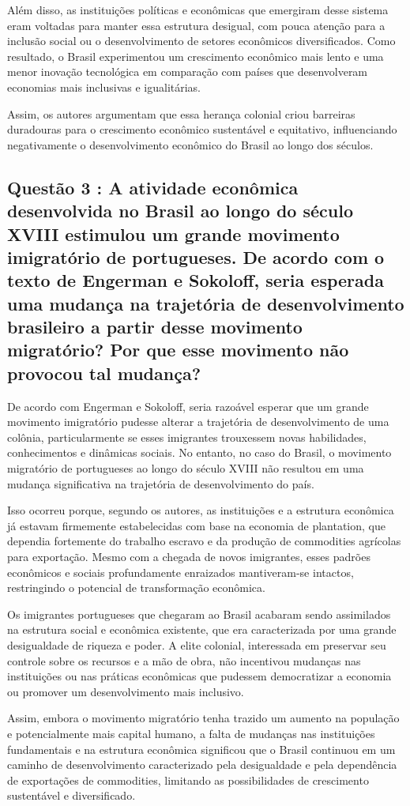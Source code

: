 \documentclass[a4paper,12pt]{article}[abntex2]
\begin{document}
Além disso, as instituições políticas e econômicas que emergiram desse sistema eram voltadas para manter essa estrutura desigual, com pouca atenção para a inclusão social ou o desenvolvimento de setores econômicos diversificados. Como resultado, o Brasil experimentou um crescimento econômico mais lento e uma menor inovação tecnológica em comparação com países que desenvolveram economias mais inclusivas e igualitárias.

Assim, os autores argumentam que essa herança colonial criou barreiras duradouras para o crescimento econômico sustentável e equitativo, influenciando negativamente o desenvolvimento econômico do Brasil ao longo dos séculos.

\subsection{\textbf{Questão 3 : A atividade econômica desenvolvida no Brasil ao longo do século XVIII estimulou um grande movimento imigratório de portugueses. De acordo com o texto de Engerman e Sokoloff, seria esperada uma mudança na trajetória de desenvolvimento brasileiro a partir desse movimento migratório? Por que esse movimento não provocou tal mudança? 
}}

De acordo com Engerman e Sokoloff, seria razoável esperar que um grande movimento imigratório pudesse alterar a trajetória de desenvolvimento de uma colônia, particularmente se esses imigrantes trouxessem novas habilidades, conhecimentos e dinâmicas sociais. No entanto, no caso do Brasil, o movimento migratório de portugueses ao longo do século XVIII não resultou em uma mudança significativa na trajetória de desenvolvimento do país.

Isso ocorreu porque, segundo os autores, as instituições e a estrutura econômica já estavam firmemente estabelecidas com base na economia de plantation, que dependia fortemente do trabalho escravo e da produção de commodities agrícolas para exportação. Mesmo com a chegada de novos imigrantes, esses padrões econômicos e sociais profundamente enraizados mantiveram-se intactos, restringindo o potencial de transformação econômica.

Os imigrantes portugueses que chegaram ao Brasil acabaram sendo assimilados na estrutura social e econômica existente, que era caracterizada por uma grande desigualdade de riqueza e poder. A elite colonial, interessada em preservar seu controle sobre os recursos e a mão de obra, não incentivou mudanças nas instituições ou nas práticas econômicas que pudessem democratizar a economia ou promover um desenvolvimento mais inclusivo.

Assim, embora o movimento migratório tenha trazido um aumento na população e potencialmente mais capital humano, a falta de mudanças nas instituições fundamentais e na estrutura econômica significou que o Brasil continuou em um caminho de desenvolvimento caracterizado pela desigualdade e pela dependência de exportações de commodities, limitando as possibilidades de crescimento sustentável e diversificado.
\end{document}
